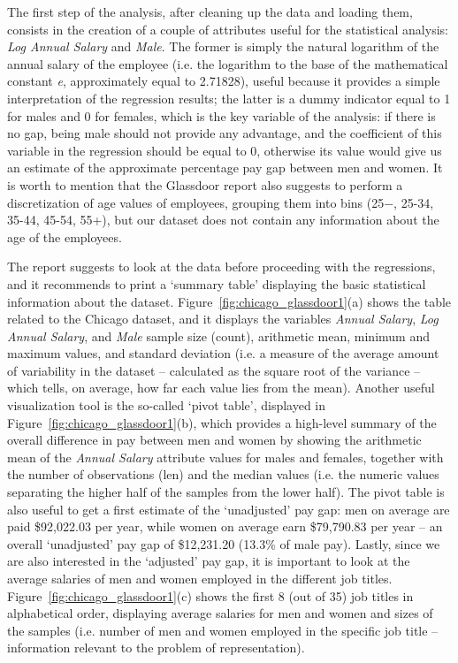 The first step of the analysis, after cleaning up the data and loading them, consists in the creation of a couple of attributes useful for the statistical analysis: \textit{Log Annual Salary} and \textit{Male}. The former is simply the natural logarithm of the annual salary of the employee (i.e. the logarithm to the base of the mathematical constant \textit{e}, approximately equal to 2.71828), useful because it provides a simple interpretation of the regression results; the latter is a dummy indicator equal to 1 for males and 0 for females, which is the key variable of the analysis: if there is no gap, being male should not provide any advantage, and the coefficient of this variable in the regression should be equal to 0, otherwise its value would give us an estimate of the approximate percentage pay gap between men and women. It is worth to mention that the Glassdoor report also suggests to perform a discretization of age values of employees, grouping them into bins (25\(-\), 25-34, 35-44, 45-54, 55+), but our dataset does not contain any information about the age of the employees.

The report suggests to look at the data before proceeding with the regressions, and it recommends to print a `summary table' displaying the basic statistical information about the dataset. Figure~\ref{fig:chicago_glassdoor1}(a) shows the table related to the Chicago dataset, and it displays the variables \textit{Annual Salary}, \textit{Log Annual Salary}, and \textit{Male} sample size (count), arithmetic mean, minimum and maximum values, and standard deviation (i.e. a measure of the average amount of variability in the dataset -- calculated as the square root of the variance -- which tells, on average, how far each value lies from the mean).
Another useful visualization tool is the so-called `pivot table', displayed in Figure~\ref{fig:chicago_glassdoor1}(b), which provides a high-level summary of the overall difference in pay between men and women by showing the arithmetic mean of the \textit{Annual Salary} attribute values for males and females, together with the number of observations (len) and the median values (i.e. the numeric values separating the higher half of the samples from the lower half). The pivot table is also useful to get a first estimate of the `unadjusted' pay gap: men on average are paid \$92,022.03 per year, while women on average earn \$79,790.83 per year -- an overall `unadjusted' pay gap of \$12,231.20 (13.3\% of male pay).
Lastly, since we are also interested in the `adjusted' pay gap, it is important to look at the average salaries of men and women employed in the different job titles. Figure~\ref{fig:chicago_glassdoor1}(c) shows the first 8 (out of 35) job titles in alphabetical order, displaying average salaries for men and women and sizes of the samples (i.e. number of men and women employed in the specific job title -- information relevant to the problem of representation).

